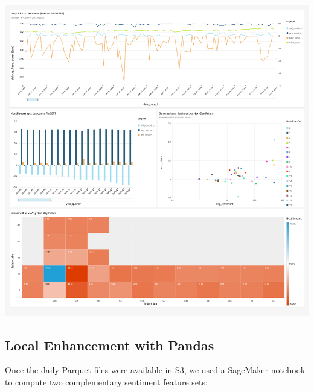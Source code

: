 \documentclass[11pt,a4paper]{article}
\begin{document}
\begin{center}
  \includegraphics[width=0.85\linewidth]{dashboard_screenshot.pdf}
\end{center}


\subsection{Local Enhancement with Pandas}

Once the daily Parquet files were available in S3, we used a SageMaker notebook to compute two complementary sentiment feature sets:
\end{document}
